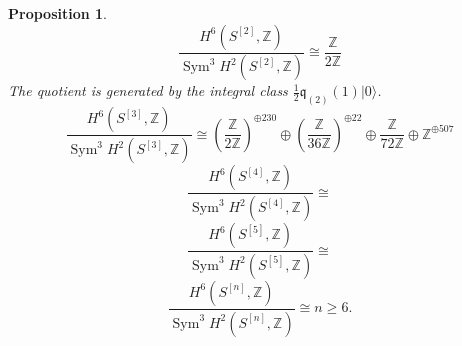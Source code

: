 \documentclass{amsart}
\DeclareMathOperator{\Sym}{Sym}
\newcommand{\hilb}[1]{^{[#1]}}
\newcommand{\vac}{|0\rangle}
\newcommand{\IZ}{\mathbb{Z}}
\newcommand{\kq}{\mathfrak{q}}
\theoremstyle{plain}
\newtheorem{proposition}[theorem]{Proposition}
\theoremstyle{definition}
\theoremstyle{remark}
\begin{document}
\begin{proposition}
$$
\frac{H^6(S\hilb{2},\IZ)}{\Sym^3 H^2(S\hilb{2},\IZ)} \cong 
\frac{\IZ}{2\IZ}
$$
The quotient is generated by the integral class $\frac{1}{2} \kq_{(2)}(1)\vac$.
$$
\frac{H^6(S\hilb{3},\IZ)}{\Sym^3 H^2(S\hilb{3},\IZ)} \cong  \left(\frac{\IZ}{2\IZ}\right)^{\oplus 230}\oplus \left(\frac{\IZ}{36\IZ}\right)^{\oplus 22}\oplus \frac{\IZ}{72\IZ} \oplus \IZ^{\oplus 507}
$$
$$
\frac{H^6(S\hilb{4},\IZ)}{\Sym^3 H^2(S\hilb{4},\IZ)} \cong  
$$
$$
\frac{H^6(S\hilb{5},\IZ)}{\Sym^3 H^2(S\hilb{5},\IZ)} \cong  
$$
$$
\frac{H^6(S\hilb{n},\IZ)}{\Sym^3 H^2(S\hilb{n},\IZ)} \cong   n\geq 6.
$$
\end{proposition}



\end{document}
